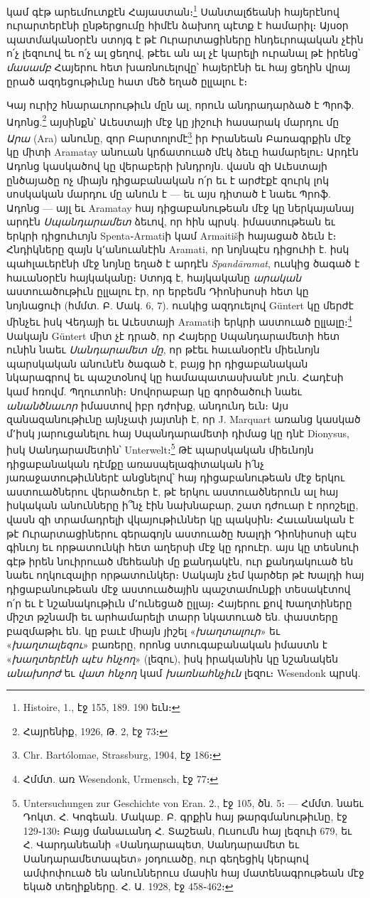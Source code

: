 \documentclass{article}
\begin{document}
{կամ գէթ արեւմուտքէն Հայաստան։\footnote{Histoire, 1., էջ 155, 189. 190 եւն։} Սանտալճեանի հայերէնով ուրարտերէնի ընթերցումը հիմէն ձախող պէտք է համարիլ։ Այսօր պատմականօրէն ստոյգ է թէ Ուրարտացիները հնդեւրոպական չէին ո՛չ լեզուով եւ ո՛չ ալ ցեղով, թէեւ ան ալ չէ կարելի ուրանալ թէ իրենց՝ \emph{մասամբ} Հայերու հետ խառնուելովը՝ հայերէնի եւ հայ ցեղին վրայ ըրած ազդեցութիւնը հատ մեծ եղած ըլլալու է։

Կայ ուրիշ հնարաւորութիւն մըն ալ, որուն անդրադարձած է Պրոֆ. Ադոնց.\footnote{Հայրենիք, 1926, Թ. 2, էջ 73։} այսինքն՝ Աւեստայի մէջ կը յիշուի հասարակ մարդու մը \emph{Արա} (Ara) անունը, զոր Բարտոլոմէ\footnote{Chr. Bartólomae, Strassburg, 1904, էջ 186։} իր Իրանեան Բառագրքին մէջ կը միտի Aramatay անուան կրճատուած մէկ ձեւը համարելու։ Արդէն Ադոնց կասկածով կը վերաբերի խնդրոյն. վասն զի Աւեստայի ընծայածը ոչ միայն դիցաբանական ո՛ր եւ է արժէքէ զուրկ լոկ սոսկական մարդու մը անուն է — եւ այս դիտած է նաեւ Պրոֆ. Ադոնց — այլ եւ Aramatay հայ դիցաբանութեան մէջ կը ներկայանայ արդէն \emph{Սպանդարամետ} ձեւով, որ հին պրսկ. իմաստութեան եւ երկրի դիցուհւոյն Spenta֊Armatiի կամ Armaitišի հայացած ձեւն է։ Հնդիկները զայն կ՚անուանէին Aramati, որ նոյնպէս դիցուհի է. իսկ պահլաւերէնի մէջ նոյնը եղած է արդէն \emph{Spandāramat}, ուսկից ծագած է հաւանօրէն հայկականը։ Ստոյգ է, հայկականը \emph{արական} աստուածութիւն ըլլալու էր, որ երբեմն Դիոնիսոսի հետ կը նոյնացուի (հմմտ. Բ. Մակ. 6, 7). ուսկից ազդուելով Güntert կը մերժէ մինչեւ իսկ Վեդայի եւ Աւեստայի Aramatiի երկրի աստուած ըլլալը։\footnote{Հմմտ. առ Wesendonk, Urmensch, էջ 77։} Սակայն Güntert միտ չէ դրած, որ Հայերը Սպանդարամետի հետ ունին նաեւ \emph{Սանդարամետ մը}, որ թէեւ հաւանօրէն միեւնոյն պարսկական անունէն ծագած է, բայց իր դիցաբանական նկարագրով եւ պաշտօնով կը համապատասխանէ յուն. Հադէսի կամ հռովմ. Պղուտոնի։ Սովորաբար կը գործածուի նաեւ \emph{անանծնաւոր} իմաստով իբր դժոխք, անդունդ եւն։ Այս զանազանութիւնը այնչափ յայտնի է, որ J. Marquart առանց կասկած մ՚իսկ յարուցանելու հայ Սպանդարամետի դիմաց կը դնէ Dionysus, իսկ Սանդարամետին՝ Unterwelt։\footnote{Untersuchungen zur Geschichte von Eran. 2., էջ 105, ծն. 5։ — Հմմտ. նաեւ Դոկտ. Հ. Կոգեան. Մակաբ. Բ. գրքին հայ թարգմանութիւնը, էջ 129֊130։ Բայց մանաւանդ Հ. Տաշեան, Ուսումն հայ լեզուի 679, եւ Հ. Վարդանեանի «Սանդարապետ, Սանդարամետ եւ Սանդարամետապետ» յօդուածը, ուր գեղեցիկ կերպով ամփոփուած են անուններուս մասին հայ մատենագրութեան մէջ եկած տեղիքները. Հ. Ա. 1928, էջ 458֊462։} Թէ պարսկական միեւնոյն դիցաբանական դէմքը առասպելագիտական ի՛նչ յառաջատութիւններէ անցնելով՝ հայ դիցաբանութեան մէջ երկու աստուածներու վերածուեր է, թէ երկու աստուածներուն ալ հայ իսկական անունները ի՞նչ էին նախնաբար, շատ դժուար է որոշելը, վասն զի տրամադրելի վկայութիւններ կը պակսին։ Հաւանական է թէ Ուրարտացիներու գերագոյն աստուածը Խալդի Դիոնիսոսի պէս գինւոյ եւ որթատունկի հետ աղերսի մէջ կը դրուէր. այս կը տեսնուի գէթ իրեն նուիրուած մեհեանի մը քանդակէն, ուր քանդակուած են նաեւ ողկուզալիր որթատունկեր։ Սակայն չեմ կարծեր թէ Խալդի հայ դիցաբանութեան մէջ աստուածային պաշտամունքի տեսակէտով ո՛ր եւ է նշանակութիւն մ՚ունեցած ըլլայ։ Հայերու քով Խաղտիները միշտ թշնամի եւ արհամարելի տարր նկատուած են. փաստերը բազմաթիւ են. կը բաւէ միայն յիշել «\emph{խաղտալուր}» եւ «\emph{խաղտալեզու}» բառերը, որոնց ստուգաբանական իմաստն է «\emph{խաղտերէնի պէս հնչող}» (լեզու), իսկ իրականին կը նշանակեն \emph{անախորժ} եւ \emph{վատ հնչող} կամ \emph{խառնահնչիւն} լեզու։ Wesendonk պրսկ. }
\end{document}
